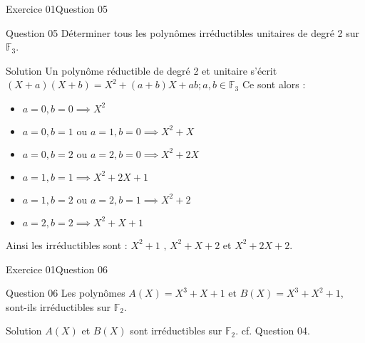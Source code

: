 \documentclass[10pt]{beamer}
\begin{document}
    \begin{frame}{Exercice 01}{Question 05}
        \begin{alertblock}{Question 05}
            Déterminer tous les polynômes irréductibles unitaires de degré 2 sur $\mathbb{F}_3$.
        \end{alertblock}
        \begin{exampleblock}{Solution}
            Un polynôme réductible de degré 2 et unitaire s'écrit $(X+a)(X+b) = X^2 + (a+b)X + ab; a,b \in \mathbb{F}_3$
            Ce sont alors : \pause
            \begin{itemize}
                \item $a=0, b=0 \implies X^2$ \pause 
                \item $a=0, b=1 \text{ ou } a=1, b=0 \implies X^2 + X$ \pause
                \item $a=0, b=2 \text{ ou } a=2, b=0 \implies X^2 + 2X$ \pause
                \item $a=1, b=1 \implies X^2 + 2X + 1$ \pause
                \item $a=1, b=2 \text{ ou } a=2, b=1 \implies X^2 + 2$ \pause
                \item $a=2, b=2 \implies X^2 + X + 1$ \pause
            \end{itemize} \pause
            Ainsi les irréductibles sont : $X^2 + 1 \text{ , } X^2 + X + 2$ et $X^2 + 2X + 2$. 
        \end{exampleblock}
    \end{frame}

    \begin{frame}{Exercice 01}{Question 06}
        \begin{alertblock}{Question 06}
            Les polynômes $A(X) = X^3 + X + 1 \text{ et } B(X) = X^3 + X^2 + 1$, sont-ils irréductibles sur $\mathbb{F}_2$.
        \end{alertblock}
        \begin{exampleblock}{Solution}
            $A(X)$ et $B(X)$ sont irréductibles sur $\mathbb{F}_2$. cf. Question 04.
        \end{exampleblock}
    \end{frame}
\end{document}
